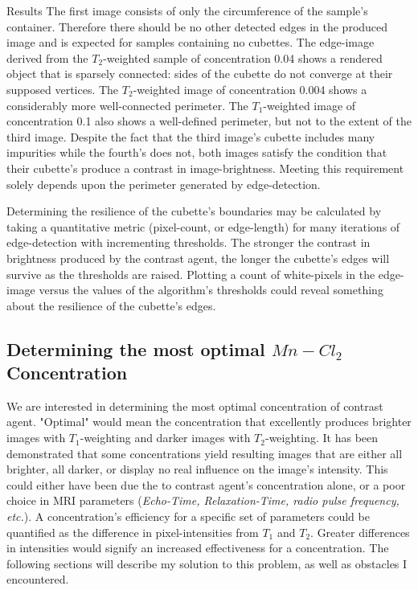 \documentclass[a4paper,12pt]{article}
\begin{document}
\begin{section}{Results}
The first image consists of only the circumference of the sample's container. Therefore there should be no other detected edges in the produced image and is expected for samples containing no cubettes. The edge-image derived from the $T_2$-weighted sample of concentration 0.04 shows a rendered object that is sparsely connected: sides of the cubette do not converge at their supposed vertices. The $T_2$-weighted image of concentration 0.004 shows a considerably more well-connected perimeter. The $T_1$-weighted image of concentration 0.1 also shows a well-defined perimeter, but not to the extent of the third image. Despite the fact that the third image's cubette includes many impurities while the fourth's does not, both images satisfy the condition that their cubette's produce a contrast in image-brightness. Meeting this requirement solely depends upon the perimeter generated by edge-detection.

Determining the resilience of the cubette's boundaries may be calculated by taking a quantitative metric (pixel-count, or edge-length) for many iterations of edge-detection with incrementing thresholds. The stronger the contrast in brightness produced by the contrast agent, the longer the cubette's edges will survive as the thresholds are raised. Plotting a count of white-pixels in the edge-image versus the values of the algorithm's thresholds could reveal something about the resilience of the cubette's edges. 

\subsection{Determining the most optimal $Mn-Cl_2$ Concentration}

We are interested in determining the most optimal concentration of contrast agent. "Optimal" would mean the concentration that excellently produces brighter images with $T_1$-weighting and darker images with $T_2$-weighting. It has been demonstrated that some concentrations yield resulting images that are either all brighter, all darker, or display no real influence on the image's intensity. This could either have been due the to contrast agent's concentration alone, or a poor choice in MRI parameters ({\em Echo-Time, Relaxation-Time, radio pulse frequency, etc.}). A concentration's efficiency for a specific set of parameters could be quantified as the difference in pixel-intensities from $T_1$ and $T_2$. Greater differences in intensities would signify an increased effectiveness for a concentration. The following sections will describe my solution to this problem, as well as obstacles I encountered.


\end{section}
\end{document}
